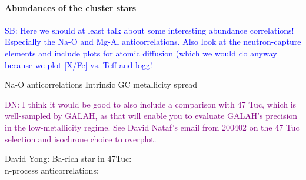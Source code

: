 \documentclass[fleqn,usenatbib,useAMS]{mnras}
\newcommand\SB[1]{\textcolor{blue}{SB: #1}}
\newcommand\DN[1]{\textcolor{purple}{DN: #1}}
\begin{document}
\paragraph*{Abundances of the cluster stars}

\SB{Here we should at least talk about some interesting abundance correlations! Especially the Na-O and Mg-Al anticorrelations. Also look at the neutron-capture elements and include plots for atomic diffusion (which we would do anyway because we plot [X/Fe] vs. Teff and logg!}

Na-O anticorrelations \citep{Carretta2009}
Intrinsic GC metallicity spread \citep{Carretta2009b}

\DN{I think it would be good to also include a comparison with 47 Tuc, which is well-sampled by GALAH, as that will enable you to evaluate GALAH's precision in the low-metallicity regime. See David Nataf's email from 200402 on the 47 Tuc selection and isochrone choice to overplot.}

David Yong: Ba-rich star in 47Tuc: \citep{Cordero2015} \\
n-process anticorrelations: \citep{DOrazi2010}
\end{document}
